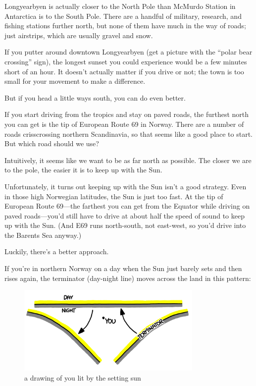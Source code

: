 {Longyearbyen is actually closer to the North Pole than McMurdo Station in Antarctica is to the South Pole. There are a handful of military, research, and fishing stations further north, but none of them have much in the way of roads; just airstrips, which are usually gravel and snow.}

{If you putter around downtown Longyearbyen (get a picture with the “polar bear crossing” sign), the longest sunset you could experience would be a few minutes short of an hour. It doesn’t actually matter if you drive or not; the town is too small for your movement to make a difference.}

{But if you head a little ways south, you can do even better.}

{If you start driving from the tropics and stay on paved roads, the furthest north you can get is the tip of European Route 69 in Norway. There are a number of roads crisscrossing northern Scandinavia, so that seems like a good place to start. But which road should we use?}

{Intuitively, it seems like we want to be as far north as possible. The closer we are to the pole, the easier it is to keep up with the Sun.}

{Unfortunately, it turns out keeping up with the Sun isn’t a good strategy. Even in those high Norwegian latitudes, the Sun is just too fast. At the tip of European Route 69—the farthest you can get from the Equator while driving on paved roads—you’d still have to drive at about half the speed of sound to keep up with the Sun. (And E69 runs north-south, not east-west, so you’d drive into the Barents Sea anyway.)}

{Luckily, there’s a better approach.}

{If you're in northern Norway on a day when the Sun just barely sets and then rises again, the terminator (day-night line) moves across the land in this pattern:}

\begin{figure}[!htbp]
\centering
\includegraphics[scale=0.5, max width=0.8\textwidth]{imgs/a/42/sunset_terminator.png}
\caption{a drawing of you lit by the setting sun}
\end{figure}


